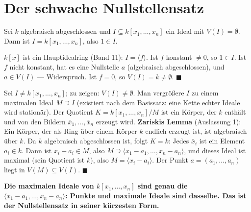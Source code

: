 \section{Der schwache Nullstellensatz}

\begin{merksatz}
Sei $k$ algebraisch abgeschlossen und $I\subseteq k[x_1, \ldots, x_n]$ ein Ideal mit $V(I) = \emptyset$. Dann ist $I = k[x_1, \ldots, x_n]$, also $1\in I$.

$k[x]$ ist ein Hauptidealring (Band 11): $I = \langle f\rangle$. Ist $f$ konstant $\ne 0$, so $1\in I$. Ist $f$ nicht konstant, hat es eine Nullstelle $a$ (algebraisch abgeschlossen), und $a\in V(I)$ --- Widerspruch. Ist $f = 0$, so $V(I) = k\ne\emptyset$. $\blacksquare$

Sei $I\ne k[x_1, \ldots, x_n]$; zu zeigen: $V(I)\ne\emptyset$. Man vergrößere $I$ zu einem maximalen Ideal $M\supseteq I$ (existiert nach dem Basissatz: eine Kette echter Ideale wird stationär). Der Quotient $K = k[x_1, \ldots, x_n]/M$ ist ein Körper, der $k$ enthält und von den Bildern $\bar x_1, \ldots, \bar x_n$ erzeugt wird. \textbf{Zariskis Lemma} (Auslassung 1): Ein Körper, der als Ring über einem Körper $k$ endlich erzeugt ist, ist algebraisch über $k$. Da $k$ algebraisch abgeschlossen ist, folgt $K = k$: Jedes $\bar x_i$ ist ein Element $a_i\in k$. Dann ist $x_i - a_i\in M$, also $M\supseteq\langle x_1 - a_1, \ldots, x_n - a_n\rangle$, und dieses Ideal ist maximal (sein Quotient ist $k$), also $M = \langle x_i - a_i\rangle$. Der Punkt $a = (a_1, \ldots, a_n)$ liegt in $V(M)\subseteq V(I)$. $\blacksquare$

\begin{center}
\begin{minipage}{0.9\textwidth}
\textbf{Die maximalen Ideale von $k[x_1, \ldots, x_n]$ sind genau die $\langle x_1 - a_1, \ldots, x_n - a_n\rangle$: Punkte und maximale Ideale sind dasselbe. Das ist der Nullstellensatz in seiner kürzesten Form.}
\end{minipage}
\end{center}

\begin{center}
\begin{minipage}{0.88\textwidth}
\end{minipage}
\end{center}
\end{merksatz}

